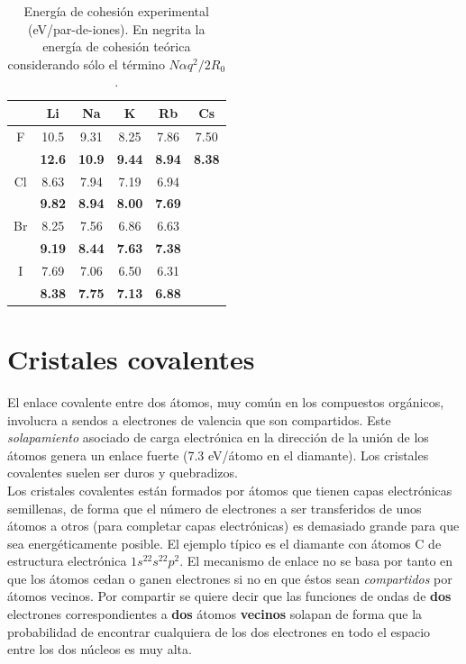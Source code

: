 \begin{table}[h!] \centering
    \begin{tabular}{c|ccccc}
        & Li & Na & K & Rb & Cs \\ \hline
        F & 10.5 & 9.31 & 8.25 & 7.86 & 7.50 \\
          & \textbf{12.6} & \textbf{10.9} & \textbf{9.44} & \textbf{8.94} & \textbf{8.38} \\ \hline
        Cl & 8.63  & 7.94 & 7.19 & 6.94 & \\
           & \textbf{9.82} & \textbf{8.94} & \textbf{8.00} & \textbf{7.69} & \\ \hline  
        Br & 8.25 & 7.56 & 6.86 & 6.63 & \\
           & \textbf{9.19} & \textbf{8.44} & \textbf{7.63} & \textbf{7.38} & \\ \hline
        I & 7.69 & 7.06 & 6.50 & 6.31 & \\
        & \textbf{8.38} & \textbf{7.75} & \textbf{7.13} & \textbf{6.88} &  
    \end{tabular}
    \caption{Energía de cohesión experimental (eV/par-de-iones). En negrita la energía de cohesión teórica considerando sólo el término $N\alpha q^2 / 2 R_0$.}
    \label{Tab:03-03}
\end{table}

\section{Cristales covalentes}

El enlace covalente entre dos átomos, muy común en los compuestos orgánicos, involucra a sendos a electrones de valencia  que son compartidos. Este \textit{solapamiento} asociado de carga electrónica en la dirección de la unión de los átomos genera un enlace fuerte (7.3 eV/átomo en el diamante). Los cristales covalentes suelen ser duros y quebradizos. \\

Los cristales covalentes están formados por átomos que tienen capas electrónicas semillenas, de forma que el número de electrones a ser transferidos de unos átomos a otros (para completar capas electrónicas) es demasiado grande para que sea energéticamente posible. El ejemplo típico es el diamante con átomos C de estructura electrónica $1s^22s^22p^2$. El mecanismo de enlace no se basa por tanto en que los átomos cedan o ganen electrones si no en que éstos sean \textit{compartidos} por átomos vecinos. Por compartir se quiere decir que las funciones de ondas de \textbf{dos} electrones correspondientes a \textbf{dos} átomos \textbf{vecinos} solapan de forma que la probabilidad de encontrar cualquiera de los dos electrones en todo el espacio entre los dos núcleos es muy alta. \\

